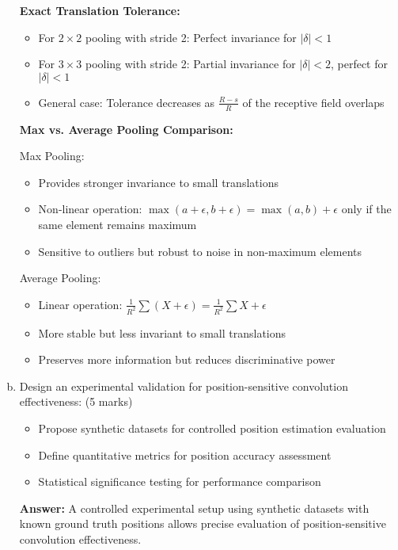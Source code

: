 \documentclass[12pt]{article}
\newcommand{\answer}[1]{{\color{answercolor}\textbf{Answer:} #1}}
\begin{document}
\begin{enumerate}[(a)]
{    \textbf{Exact Translation Tolerance:}
    
    \begin{itemize}
        \item For $2 \times 2$ pooling with stride 2: Perfect invariance for $|\delta| < 1$
        \item For $3 \times 3$ pooling with stride 2: Partial invariance for $|\delta| < 2$, perfect for $|\delta| < 1$
        \item General case: Tolerance decreases as $\frac{R-s}{R}$ of the receptive field overlaps
    \end{itemize}
    
    \textbf{Max vs. Average Pooling Comparison:}
    
    Max Pooling:
    \begin{itemize}
        \item Provides stronger invariance to small translations
        \item Non-linear operation: $\max(a+\epsilon, b+\epsilon) = \max(a,b) + \epsilon$ only if the same element remains maximum
        \item Sensitive to outliers but robust to noise in non-maximum elements
    \end{itemize}
    
    Average Pooling:
    \begin{itemize}
        \item Linear operation: $\frac{1}{R^2}\sum(X + \epsilon) = \frac{1}{R^2}\sum X + \epsilon$
        \item More stable but less invariant to small translations
        \item Preserves more information but reduces discriminative power
    \end{itemize}
    }
    
    \item Design an experimental validation for position-sensitive convolution effectiveness: \hfill (5 marks)
    \begin{itemize}
        \item Propose synthetic datasets for controlled position estimation evaluation
        \item Define quantitative metrics for position accuracy assessment
        \item Statistical significance testing for performance comparison
    \end{itemize}
    
    \answer{A controlled experimental setup using synthetic datasets with known ground truth positions allows precise evaluation of position-sensitive convolution effectiveness.}
    

\end{enumerate}
\end{document}
